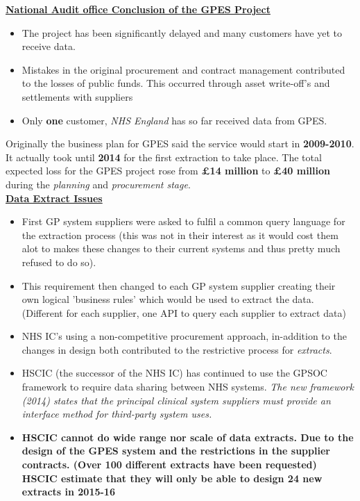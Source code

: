 \documentclass[a4paper]{report}
\begin{document}
\underline{\textbf{National Audit office Conclusion of the GPES Project}}
\begin{itemize}
\item The project has been significantly delayed and many customers have yet to receive data.
\item Mistakes in the original procurement and contract management contributed to the losses of public funds. This occurred through asset write-off's and settlements with suppliers
\item Only \textbf{one} customer, \textit{NHS England} has so far received data from GPES.\\
\end{itemize}

Originally the business plan for GPES said the service would start in \textbf{2009-2010}. It actually took until \textbf{2014} for the first extraction to take place. The total expected loss for the GPES project rose from \textbf{£14 million} to \textbf{£40 million} during the \textit{planning} and \textit{procurement stage}.\\

\underline{\textbf{Data Extract Issues}}
\begin{itemize}
\item First GP system suppliers were asked to fulfil a common query language for the extraction process (this was not in their interest as it would cost them alot to makes these changes to their current systems and thus pretty much refused to do so).
\item This requirement then changed to each GP system supplier creating their own logical 'business rules' which would be used to extract the data. (Different for each supplier, one API to query each supplier to extract data)
\item NHS IC's using a non-competitive procurement approach, in-addition to the changes in design both contributed to the restrictive process for \textit{extracts}.
\item HSCIC (the successor of the NHS IC) has continued to use the GPSOC framework to require data sharing between NHS systems. \textit{The new framework (2014) states that the principal clinical system suppliers must provide an interface method for third-party system uses.}

\item \textbf{HSCIC cannot do wide range nor scale of data extracts. Due to the design of the GPES system and the restrictions in the supplier contracts. (Over 100 different extracts have been requested) HSCIC estimate that they will only be able to design 24 new extracts in 2015-16}\\
\end{itemize}
\end{document}
